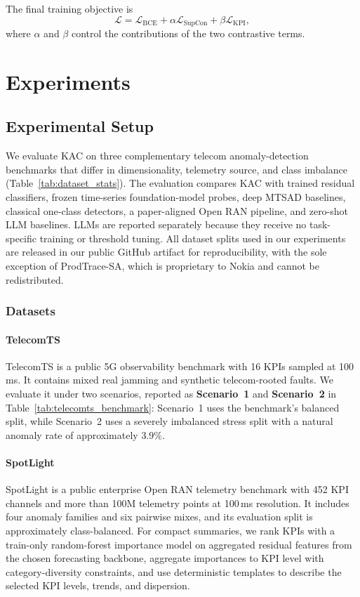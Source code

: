 \documentclass[conference]{IEEEtran}
\begin{document}
The final training objective is
\begin{equation}
\mathcal{L}
=
\mathcal{L}_{\mathrm{BCE}}
+
\alpha \mathcal{L}_{\mathrm{SupCon}}
+
\beta \mathcal{L}_{\mathrm{KPI}},
\end{equation}
where $\alpha$ and $\beta$ control the contributions of the two contrastive terms.

\section{Experiments}
\label{sec:experiments}

\subsection{Experimental Setup}
\label{sec:setup}

We evaluate KAC on three complementary telecom anomaly-detection benchmarks that differ in dimensionality, telemetry source, and class imbalance (Table~\ref{tab:dataset_stats}). The evaluation compares KAC with trained residual classifiers, frozen time-series foundation-model probes, deep MTSAD baselines, classical one-class detectors, a paper-aligned Open RAN pipeline, and zero-shot LLM baselines. LLMs are reported separately because they receive no task-specific training or threshold tuning. All dataset splits used in our experiments are released in our public GitHub artifact for reproducibility, with the sole exception of ProdTrace-SA, which is proprietary to Nokia and cannot be redistributed.

\subsubsection{Datasets}
\label{sec:datasets}

\paragraph{TelecomTS~\cite{feng2025telecomts}}
TelecomTS is a public 5G observability benchmark with 16 KPIs sampled at 100\,ms. It contains mixed real jamming and synthetic telecom-rooted faults. We evaluate it under two scenarios, reported as \textbf{Scenario~1} and \textbf{Scenario~2} in Table~\ref{tab:telecomts_benchmark}: Scenario~1 uses the benchmark's balanced split, while Scenario~2 uses a severely imbalanced stress split with a natural anomaly rate of approximately $3.9\%$.

\paragraph{SpotLight~\cite{sun2024spotlight}}
SpotLight is a public enterprise Open RAN telemetry benchmark with 452 KPI channels and more than 100M telemetry points at 100\,ms resolution. It includes four anomaly families and six pairwise mixes, and its evaluation split is approximately class-balanced. For compact summaries, we rank KPIs with a train-only random-forest importance model on aggregated residual features from the chosen forecasting backbone, aggregate importances to KPI level with category-diversity constraints, and use deterministic templates to describe the selected KPI levels, trends, and dispersion.
\end{document}
